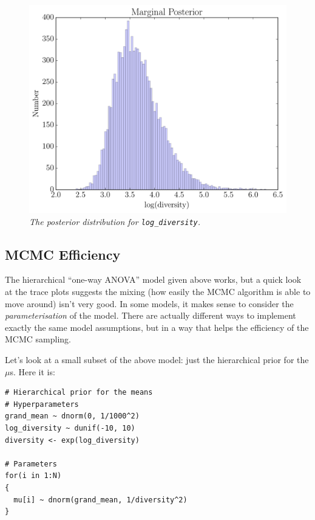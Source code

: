 \begin{figure}[ht!]
\begin{center}
\includegraphics[scale=0.6]{Figures/diversity.pdf}
\caption{\it The posterior distribution for {\tt log\_diversity}.\label{fig:diversity}}
\end{center}
\end{figure}

\subsection{MCMC Efficiency}
The hierarchical ``one-way ANOVA'' model given above works, but a quick look
at the trace plots suggests the mixing (how easily the MCMC algorithm is
able to move around) isn't very good. In some models, it makes sense to
consider the {\it parameterisation} of the model. There are actually different
ways to implement exactly the same model assumptions, but in a way that helps
the efficiency of the MCMC sampling.

Let's look at a small subset of the above model: just the hierarchical prior
for the $\mu$s. Here it is:

\begin{verbatim}
# Hierarchical prior for the means
# Hyperparameters
grand_mean ~ dnorm(0, 1/1000^2)
log_diversity ~ dunif(-10, 10)
diversity <- exp(log_diversity)

# Parameters
for(i in 1:N)
{
  mu[i] ~ dnorm(grand_mean, 1/diversity^2)
}
\end{verbatim}


